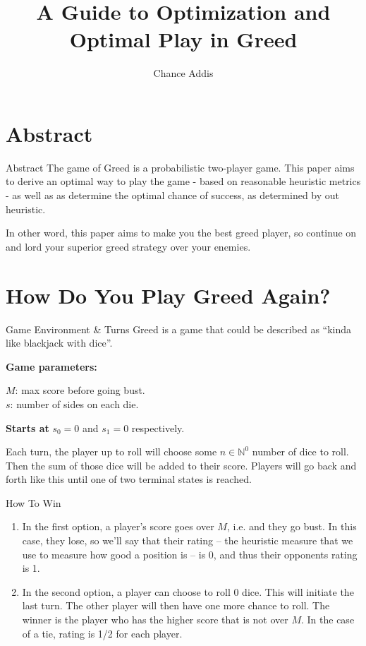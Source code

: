 \documentclass{beamer}
\title{A Guide to Optimization and Optimal Play in Greed}
\author{Chance Addis}
\affil{Department of Mathematics and Statistics, Reed College}
\begin{document}
\maketitle

\section{Abstract}
\begin{frame}{Abstract}
    The game of Greed is a probabilistic two-player game. This paper aims to derive an optimal way to play the game - based on reasonable heuristic metrics - as well as as determine the optimal chance of success, as determined by out heuristic. 

    In other word, this paper aims to make you the best greed player, so continue on and lord your superior greed strategy over your enemies. 
\end{frame}

\section{How Do You Play Greed Again?}
\begin{frame}{Game Environment \& Turns}
    Greed is a game that could be described as ``kinda like blackjack with dice''.

    \textbf{Game parameters:}
    
    $M$: max score before going bust. \\
    $s$: number of sides on each die.

    \textbf{Starts at}
    $s_0 = 0$ and $s_1 = 0$ respectively.

    Each turn, the player up to roll will choose some $n \in \mathbb{N}^0$ number of dice to roll. Then the sum of those dice will be added to their score. Players will go back and forth like this until one of two terminal states is reached.
\end{frame}

\begin{frame}{How To Win}
    \begin{enumerate}
        \item In the first option, a player's score goes over $M$, i.e. and they go bust. In this case, they lose, so we'll say that their rating -- the heuristic measure that we use to measure how good a position is -- is 0, and thus their opponents rating is 1. 
        \item In the second option, a player can choose to roll 0 dice. This will initiate the last turn. The other player will then have one more chance to roll. The winner is the player who has the higher score that is not over $M$. In the case of a tie, rating is 1/2 for each player. 
    \end{enumerate}
\end{frame}
\end{document}
